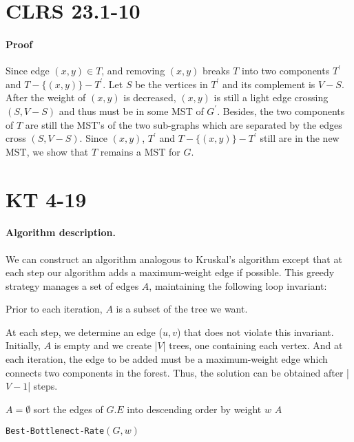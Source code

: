 \documentclass[paper=a4, fontsize=12pt]{scrartcl} %
\numberwithin{equation}{section} %
\numberwithin{figure}{section} %
\numberwithin{table}{section} %
\begin{document}
\section{CLRS 23.1-10}

\paragraph{Proof} Since edge $(x,y) \in T$,  and removing $(x,y)$ breaks $T$ into two components $T^{'}$ and $T - \{(x,y)\} - T^{'}$. Let $S$ be the vertices in $T^{'}$ and its complement is $V - S$. After the weight of $(x,y)$ is decreased, $(x,y)$ is still a light edge crossing $(S, V - S)$ and thus must be in some MST of $G^{'}$. Besides, the two components of $T$ are still the MST's of the two sub-graphs which are separated by the edges cross $(S, V - S)$. Since $(x,y)$, $T^{'}$ and $T - \{(x,y)\} - T^{'}$ still are in the new MST, we show that $T$ remains a MST for $G$. 


\section{KT 4-19}   

\paragraph{Algorithm description.} We can construct an algorithm analogous to Kruskal's algorithm except that at each step our algorithm adds a maximum-weight edge if possible. This greedy strategy manages a set of edges $A$, maintaining the following loop invariant:
\begin{center}
Prior to each iteration, $A$ is a subset of the tree we want. 
\end{center}
At each step, we determine an edge ($u, v$) that does not violate this invariant. Initially, $A$ is empty and we create |$V$| trees, one containing each vertex. And at each iteration, the edge to be added must be a maximum-weight edge which connects two components in the forest.
Thus, the solution can be obtained after |$V - 1$| steps.

\begin{algorithm}[H] 
\SetAlgoLined
\SetNoFillComment
\DontPrintSemicolon
{}
$A = \emptyset$ \;
sort the edges of $G.E$ into descending order by weight $w$ \;
\Return $A$ 
\caption{\texttt{Best-Bottlenect-Rate}$(G,w)$}
\end{algorithm}
\end{document}
